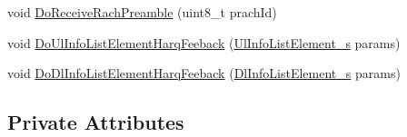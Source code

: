 \begin{DoxyCompactItemize}
\item 
void \hyperlink{classns3_1_1LteEnbMac_a48d4598df5a527e9ae2fb5319cfdb1ff}{Do\+Receive\+Rach\+Preamble} (uint8\+\_\+t prach\+Id)
\item 
void \hyperlink{classns3_1_1LteEnbMac_a53b7bdf995107a0b1b601de81e068390}{Do\+Ul\+Info\+List\+Element\+Harq\+Feeback} (\hyperlink{structns3_1_1UlInfoListElement__s}{Ul\+Info\+List\+Element\+\_\+s} params)
\item 
void \hyperlink{classns3_1_1LteEnbMac_a9cf7fe06d2d0d4a7e72f08b123029965}{Do\+Dl\+Info\+List\+Element\+Harq\+Feeback} (\hyperlink{structns3_1_1DlInfoListElement__s}{Dl\+Info\+List\+Element\+\_\+s} params)
\end{DoxyCompactItemize}
\subsection*{Private Attributes}
